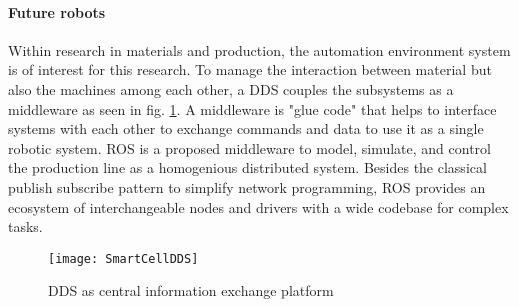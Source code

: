 \paragraph{Future robots}
Within research in materials and production, the automation environment system is of interest for this research.
To manage the interaction between material but also the machines among each other, a \ac{DDS} couples the subsystems as a middleware as seen in \ac{fig}. \ref{fig:SmartCellDDS}. A middleware is "glue code" that helps to interface systems with each other to exchange commands and data to use it as a single robotic system. 
\ac{ROS} is a proposed middleware to model, simulate, and control the production line as a homogenious distributed system. 
Besides the classical publish subscribe  pattern to simplify network programming, \ac{ROS} provides an ecosystem of interchangeable nodes and drivers with a wide codebase for complex tasks.
\medskip
\begin{figure}[H]
	\texttt{[image: SmartCellDDS]}
	\caption{\ac{DDS} as central information exchange platform}
	\label{fig:SmartCellDDS}
\end{figure}

%
